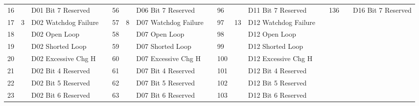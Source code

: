 \documentclass[]{article}
\begin{document}
\begin{landscape}
\begin{table}[]
\begin{tabular}{lllllllllllllll}
			16           &                    & D01 Bit 7 Reserved            &                   & 56           &                     & D06 Bit 7 Reserved   &  & 96           &                     & D11 Bit 7 Reserved   &  & 136               &                     & D16 Bit 7 Reserved   \\ \cline{1-3} \cline{5-7} \cline{9-11} \cline{13-15} 
			17           & \multirow{8}{*}{3} & D02 Watchdog Failure          &                   & 57           & \multirow{8}{*}{8}  & D07 Watchdog Failure &  & 97           & \multirow{8}{*}{13} & D12 Watchdog Failure &  &                   &                     &                      \\
			18           &                    & D02 Open Loop                 &                   & 58           &                     & D07 Open Loop        &  & 98           &                     & D12 Open Loop        &  &                   &                     &                      \\
			19           &                    & D02 Shorted Loop              &                   & 59           &                     & D07 Shorted Loop     &  & 99           &                     & D12 Shorted Loop     &  &                   &                     &                      \\
			20           &                    & D02 Excessive Chg H           &                   & 60           &                     & D07 Excessive Chg H  &  & 100          &                     & D12 Excessive Chg H  &  &                   &                     &                      \\
			21           &                    & D02 Bit 4 Reserved            &                   & 61           &                     & D07 Bit 4 Reserved   &  & 101          &                     & D12 Bit 4 Reserved   &  &                   &                     &                      \\
			22           &                    & D02 Bit 5 Reserved            &                   & 62           &                     & D07 Bit 5 Reserved   &  & 102          &                     & D12 Bit 5 Reserved   &  &                   &                     &                      \\
			23           &                    & D02 Bit 6 Reserved            &                   & 63           &                     & D07 Bit 6 Reserved   &  & 103          &                     & D12 Bit 6 Reserved   &  &                   &                     &                      \\

\end{tabular}
\end{table}
\end{landscape}
\end{document}
